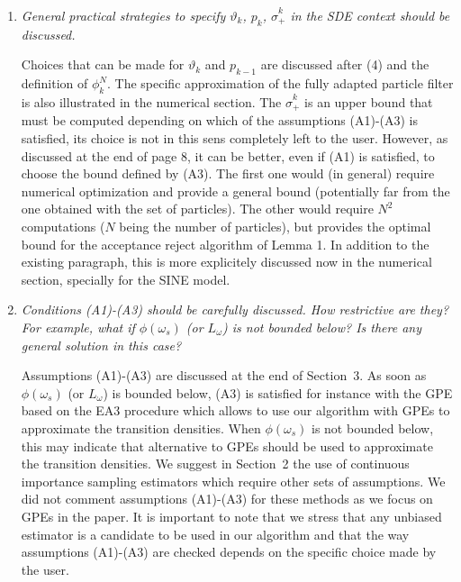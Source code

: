 \documentclass[12pt]{article}
\newcommand{\1}{\mathrm{1}}
\begin{document}
\begin{enumerate}
\item {\em General practical strategies to specify $\vartheta_k$, $p_k$, $\hat{\sigma}_+^k$ in the SDE context should be
discussed.}

\vspace{.3cm}

Choices that can be made for  $\vartheta_k$ and $p_{k-1}$ are discussed after (4) and the definition of $\phi_k^N$. The specific approximation of the fully adapted particle filter is also illustrated in the numerical section. The $\widehat{\sigma}_+^k$ is an upper bound that must be computed depending on which of the assumptions (A1)-(A3) is satisfied, its choice  is not in this sens completely left to the  user. However, as discussed at the end of page 8, it can be better, even if (A1) is satisfied, to choose the bound defined by (A3). The first one would (in general) require numerical optimization and provide a general bound (potentially far from the one obtained with the set of particles). The other would require $N^2$ computations ($N$ being the number of particles), but provides the optimal bound for the acceptance reject algorithm of Lemma 1. In addition to the existing paragraph, this is more explicitely discussed now in the numerical section, specially for the SINE model.  

\item {\em Conditions (A1)-(A3) should be carefully discussed. How restrictive are they? For
example, what if $\phi(\omega_s)$ (or $L_\omega$) is not bounded below? Is there any general solution
in this case?}

\vspace{.3cm}

Assumptions (A1)-(A3) are discussed at the end of Section~3. As soon as $\phi(\omega_s)$ (or $L_\omega$) is bounded below, (A3) is satisfied  for instance with the GPE based on the  EA3 procedure  which allows to use our algorithm with GPEs to approximate the transition densities. When $\phi(\omega_s)$ is not bounded below, this may indicate that alternative to GPEs should be used to approximate the transition densities. We suggest in Section~2 the use of continuous importance sampling estimators which require other sets of assumptions. We did not comment assumptions (A1)-(A3) for these methods as we focus on GPEs in the paper. It is important to note that we stress that any unbiased estimator is a candidate to be used in our algorithm and that the way assumptions (A1)-(A3) are checked depends on the specific choice made by the user.


\end{enumerate}
\end{document}
